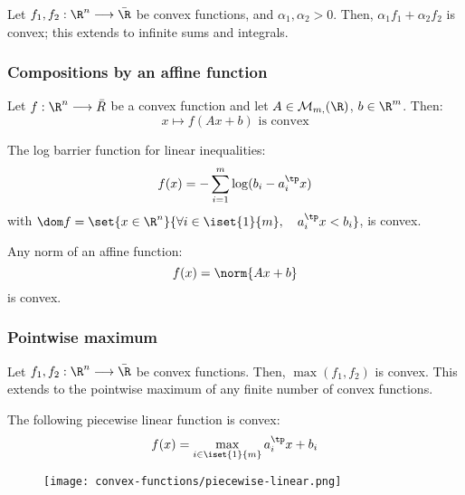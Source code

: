\begin{property}
    Let $f_1, f_2:\R^n\longrightarrow\bar{\R}$ be convex functions, and $\alpha_1,\alpha_2>0$. Then, $\alpha_1f_1+\alpha_2f_2$ is convex; this extends to infinite sums and integrals.
\end{property}

\subsubsection{Compositions by an affine function}
\begin{property}
    Let $f:\R^n\longrightarrow\bar{R}$ be a convex function and let $A\in\mathcal{M}_{m,}(\R)$, $b\in\R^m$. Then:
    \begin{equation*}
        x\longmapsto f(Ax+b) \text{ is convex}
    \end{equation*}
\end{property}

\begin{example}
    The log barrier function for linear inequalities:
    \begin{equation*}
        f(x) = -\sum_{i=1}^m \log(b_i-a_i^\tp x)
    \end{equation*}
    with $\dom f=\set{x\in\R^n}{\forall i\in\iset{1}{m}, \quad a_i^\tp x<b_i}$, is convex.
\end{example}

\begin{example}
    Any norm of an affine function:
    \begin{equation*}
        f(x) = \norm{Ax+b}
    \end{equation*}
    is convex.
\end{example}

\subsubsection{Pointwise maximum}
\begin{property}
    Let $f_1, f_2:\R^n\longrightarrow\bar{\R}$ be convex functions. Then, $\max(f_1, f_2)$ is convex. This extends to the pointwise maximum of any finite number of convex functions.
\end{property}

\begin{example}
    The following piecewise linear function is convex:
    \begin{equation*}
        f(x) = \max_{i\in\iset{1}{m}} a_i^\tp x + b_i
    \end{equation*}

    \begin{figure}[H]
        \centering
        \texttt{[image: convex-functions/piecewise-linear.png]}
    \end{figure}
\end{example}

